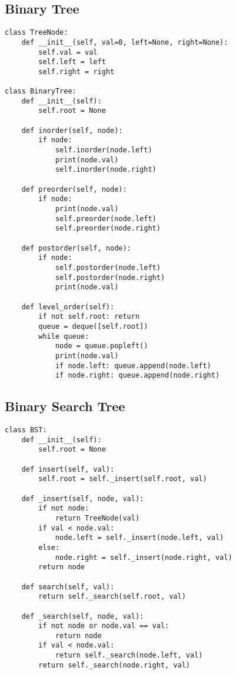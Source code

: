 \subsection{Binary Tree}
\begin{verbatim}
class TreeNode:
    def __init__(self, val=0, left=None, right=None):
        self.val = val
        self.left = left
        self.right = right

class BinaryTree:
    def __init__(self):
        self.root = None
    
    def inorder(self, node):
        if node:
            self.inorder(node.left)
            print(node.val)
            self.inorder(node.right)
    
    def preorder(self, node):
        if node:
            print(node.val)
            self.preorder(node.left)
            self.preorder(node.right)
    
    def postorder(self, node):
        if node:
            self.postorder(node.left)
            self.postorder(node.right)
            print(node.val)
    
    def level_order(self):
        if not self.root: return
        queue = deque([self.root])
        while queue:
            node = queue.popleft()
            print(node.val)
            if node.left: queue.append(node.left)
            if node.right: queue.append(node.right)
\end{verbatim}

\subsection{Binary Search Tree}
\begin{verbatim}
class BST:
    def __init__(self):
        self.root = None
    
    def insert(self, val):
        self.root = self._insert(self.root, val)
    
    def _insert(self, node, val):
        if not node:
            return TreeNode(val)
        if val < node.val:
            node.left = self._insert(node.left, val)
        else:
            node.right = self._insert(node.right, val)
        return node
    
    def search(self, val):
        return self._search(self.root, val)
    
    def _search(self, node, val):
        if not node or node.val == val:
            return node
        if val < node.val:
            return self._search(node.left, val)
        return self._search(node.right, val)
\end{verbatim}


